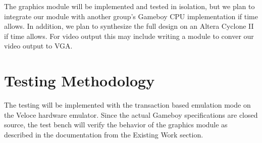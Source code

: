 \documentclass{article}
\begin{document}
The graphics module will be implemented and tested in isolation, 
but we plan to integrate our module with another group's Gameboy CPU 
implementation if time allows.  In addition, we plan to synthesize
the full design on an Altera Cyclone II if time allows.
For video output this may include writing a module to conver our 
video output to VGA.


\section{Testing Methodology}
The testing will be implemented with the transaction based
emulation mode on the Veloce hardware emulator. Since the 
actual Gameboy specifications are closed source, the test 
bench will verify the behavior of the graphics module as
described in the documentation from the Existing Work 
section.
\end{document}
